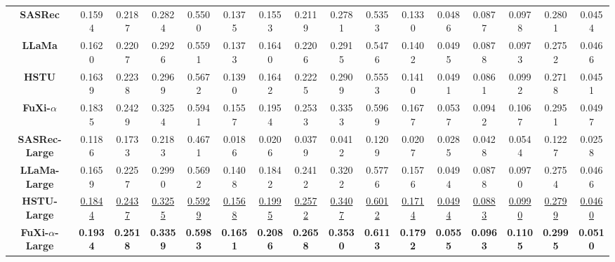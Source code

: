 \begin{table*}[t]
{\begin{tabular}{c|c|c|c|c|c|c|c|c|c|c|c|c|c|c|c}
\hline
\textbf{SASRec} & 0.1594 & 0.2187 &0.2824 & 0.5500 & 0.1375 & 0.1553 & 0.2119 & 0.2781 & 0.5353 & 0.1330 & 0.0486 & 0.0877 &  0.0978 & 0.2801  & 0.0454\\
\textbf{LLaMa} & 0.1620 & 0.2207 & 0.2926 & 0.5591 & 0.1373 & 0.1640 & 0.2206& 0.2915&0.5476 & 0.1402 & 0.0495 & 0.0878 & 0.0973  & 0.2752 & 0.0466\\
\textbf{HSTU} & 0.1639 & 0.2238 & 0.2969 & 0.5672 & 0.1390 & 0.1642 & 0.2225 & 0.2909 & 0.5553 & 0.1410 & 0.0491 & 0.0861 & 0.0992 & 0.2718 & 0.0451 \\
\textbf{FuXi-$\alpha$} & 0.1835 & 0.2429 & 0.3254 & 0.5941 &0.1557 & 0.1954 & 0.2533 & 0.3353 & 0.5969 & 0.1677 & 0.0537 & 0.0942 & 0.1067  & 0.2951 & 0.0497 \\
\hline 
\textbf{SASRec-Large} & 0.1186 & 0.1733 & 0.2183 & 0.4671 & 0.0186 & 0.0206 & 0.0379 & 0.0412 & 0.1209 & 0.0207 & 0.0285 & 0.0428 & 0.0544 & 0.1227  & 0.0258 \\
\textbf{LLaMa-Large} & 0.1659 & 0.2257 & 0.2990 & 0.5692 & 0.1408 & 0.1842 & 0.2412 & 0.3202 & 0.5776 & 0.1576 & 0.0494 & 0.0878 & 0.0970 & 0.2754 & 0.0466\\
\textbf{HSTU-Large} & \underline{0.1844} & \underline{0.2437} & \underline{0.3255} & \underline{0.5929} & \underline{0.1568}  & \underline{0.1995} & \underline{0.2572} & \underline{0.3407} & \underline{0.6012} & \underline{0.1714}  & \underline{0.0494} & \underline{0.0883} & \underline{0.0990} & \underline{0.2799} & \underline{0.0460}  \\
\textbf{FuXi-$\alpha$-Large}  & \textbf{0.1934} &  \textbf{0.2518} & \textbf{0.3359} & \textbf{0.5983} & \textbf{0.1651} & \textbf{0.2086} & \textbf{0.2658} & \textbf{0.3530} & \textbf{0.6113} & \textbf{0.1792} & \textbf{0.0555} & \textbf{0.0963} & \textbf{0.1105} & \textbf{0.2995} & \textbf{0.0510}  \\ \hline
\end{tabular}
}
\label{tab:public_performance}
\end{table*}


